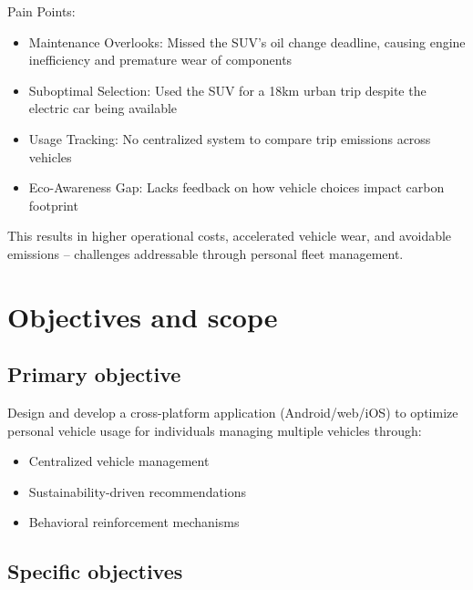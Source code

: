 Pain Points:

\begin{itemize}
    \item Maintenance Overlooks: Missed the SUV's oil change deadline, causing engine inefficiency and premature wear of components
    
    \item Suboptimal Selection: Used the SUV for a 18km urban trip despite the electric car being available
    
    \item Usage Tracking: No centralized system to compare trip emissions across vehicles
    
    \item Eco-Awareness Gap: Lacks feedback on how vehicle choices impact carbon footprint
\end{itemize}

This results in higher operational costs, accelerated vehicle wear, and avoidable emissions – challenges addressable through personal fleet management.

\section{Objectives and scope}

\subsection{Primary objective}

Design and develop a cross-platform application (Android/web/iOS) to optimize personal vehicle usage for individuals managing multiple vehicles through:

\begin{itemize}
    \item Centralized vehicle management
    
    \item Sustainability-driven recommendations
    
    \item Behavioral reinforcement mechanisms
\end{itemize}

\subsection{Specific objectives}

